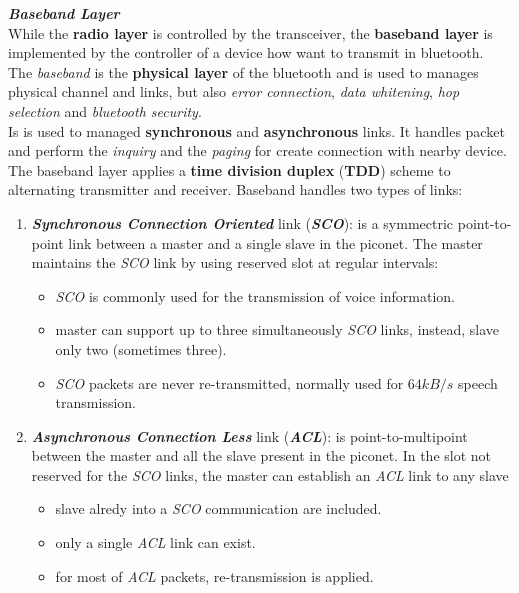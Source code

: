 \textbf{\textit{Baseband Layer}} \\
While the \textbf{radio layer} is controlled by the transceiver, the \textbf{baseband layer} is implemented by the controller of a device how want to transmit in bluetooth. The \textit{baseband} is the \textbf{physical layer} of the bluetooth and is used to manages physical channel and links, but also \textit{error connection}, \textit{data whitening}, \textit{hop selection} and \textit{bluetooth security}. \\
Is is used to managed \textbf{synchronous} and \textbf{asynchronous} links. It handles packet and perform the \textit{inquiry} and the \textit{paging} for create connection with nearby device. The baseband layer applies a \textbf{time division duplex} (\textbf{TDD}) scheme to alternating transmitter and receiver. Baseband handles two types of links:
\begin{enumerate}[nosep]
    \item \textbf{\textit{Synchronous Connection Oriented}} link (\textbf{\textit{SCO}}): is a symmectric point-to-point link between a master and a single slave in the piconet. The master maintains the \textit{SCO} link by using reserved slot at regular intervals:
    \begin{itemize}[nosep]
        \item \textit{SCO} is commonly used for the transmission of voice information.
        \item master can support up to three simultaneously \textit{SCO} links, instead, slave only two (sometimes three).
        \item \textit{SCO} packets are never re-transmitted, normally used for $64kB/s$ speech transmission.
    \end{itemize}
    \item \textbf{\textit{Asynchronous Connection Less}} link (\textbf{\textit{ACL}}): is point-to-multipoint between the master and all the slave present in the piconet. In the slot not reserved for the \textit{SCO} links, the master can establish an \textit{ACL} link to any slave
    \begin{itemize}[nosep]
        \item slave alredy into a \textit{SCO} communication are included.
        \item only a single \textit{ACL} link can exist.
        \item for most of \textit{ACL} packets, re-transmission is applied.
    \end{itemize}
\end{enumerate}
